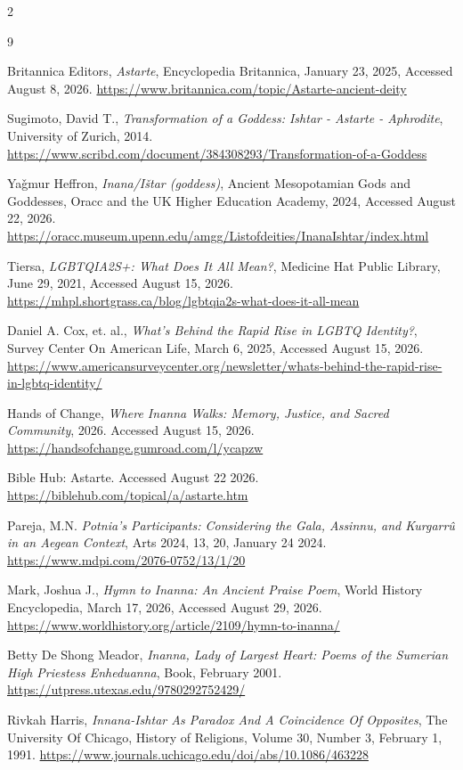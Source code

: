 \documentclass[10pt]{article}
\begin{document}
\begin{multicols}{2}
\begin{thebibliography}{9}
{	 Britannica Editors, \textit{Astarte}, Encyclopedia Britannica, January 23, 2025, Accessed August 8, 2026. \url{https://www.britannica.com/topic/Astarte-ancient-deity}
	
	 Sugimoto, David T., \textit{Transformation of a Goddess: Ishtar - Astarte - Aphrodite}, University of Zurich, 2014.  \url{https://www.scribd.com/document/384308293/Transformation-of-a-Goddess}
	
	 Yaǧmur Heffron, \textit{Inana/Ištar (goddess)}, Ancient Mesopotamian Gods and Goddesses, Oracc and the UK Higher Education Academy, 2024, Accessed August 22, 2026. \url{https://oracc.museum.upenn.edu/amgg/Listofdeities/InanaIshtar/index.html} 
	
	 Tiersa, \textit{LGBTQIA2S+: What Does It All Mean?}, Medicine Hat Public Library, June 29, 2021, Accessed August 15, 2026. \url{https://mhpl.shortgrass.ca/blog/lgbtqia2s-what-does-it-all-mean}
	
	  Daniel A. Cox, et. al., \textit{What’s Behind the Rapid Rise in LGBTQ Identity?}, Survey Center On American Life, March 6, 2025, Accessed August 15, 2026. \url{https://www.americansurveycenter.org/newsletter/whats-behind-the-rapid-rise-in-lgbtq-identity/}
	
	 Hands of Change, \textit{Where Inanna Walks: Memory, Justice, and Sacred Community}, 2026. Accessed August 15, 2026. \url{https://handsofchange.gumroad.com/l/ycapzw}
		
	 Bible Hub: Astarte. Accessed August 22 2026. \url{https://biblehub.com/topical/a/astarte.htm}
	
	  Pareja, M.N. \textit{Potnia’s Participants: Considering the Gala, Assinnu, and Kurgarrû in an Aegean Context}, Arts 2024, 13, 20, January 24 2024. \url{https://www.mdpi.com/2076-0752/13/1/20}
	
	 Mark, Joshua J., \textit{Hymn to Inanna: An Ancient Praise Poem}, World History Encyclopedia, March 17, 2026, Accessed August 29, 2026.  \url{https://www.worldhistory.org/article/2109/hymn-to-inanna/}
	
	 Betty De Shong Meador, \textit{Inanna, Lady of Largest Heart: Poems of the Sumerian High Priestess Enheduanna}, Book, February 2001. \url{https://utpress.utexas.edu/9780292752429/}
	
	 Rivkah Harris, \textit{Innana-Ishtar As Paradox And A Coincidence Of Opposites}, The University Of Chicago, History of Religions, Volume 30, Number 3, February 1, 1991. \url{https://www.journals.uchicago.edu/doi/abs/10.1086/463228}
	
}
\end{thebibliography}
\end{multicols}
\end{document}
